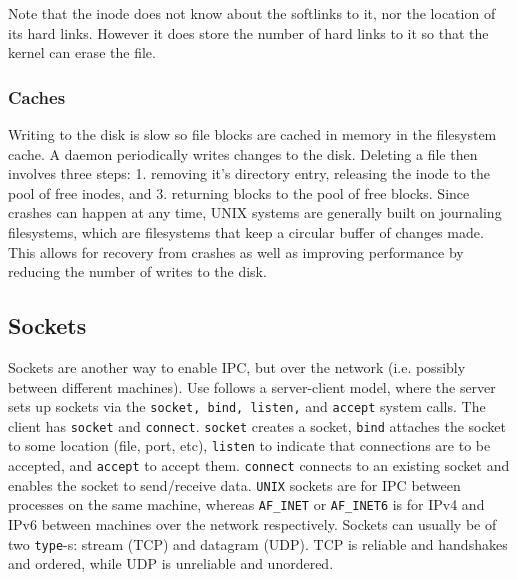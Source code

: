\documentclass[../notes.tex]{subfiles}
\begin{document}
Note that the inode does not know about the softlinks to it, nor the location of its hard links. However it does store the number of hard links to it so that the kernel can erase the file.

\subsubsection{Caches}

Writing to the disk is slow so file blocks are cached in memory in the filesystem cache. A daemon periodically writes changes to the disk.
Deleting a file then involves three steps: 1. removing it's directory entry, releasing the inode to the pool of free inodes, and 3. returning blocks to the pool of free blocks.
Since crashes can happen at any time, UNIX systems are generally built on journaling filesystems, which are filesystems that keep a circular buffer of changes made. This allows for recovery from crashes as well as improving performance by reducing the number of writes to the disk. 






\subsection{Sockets}

Sockets are another way to enable IPC, but over the network (i.e. possibly between different machines).
Use follows a server-client model, where the server sets up sockets via the \texttt{socket, bind, listen,} and \texttt{accept} system calls. The client has \texttt{socket} and \texttt{connect}.
\texttt{socket} creates a socket, \texttt{bind} attaches the socket to some location (file, port, etc), \texttt{listen} to indicate that connections are to be accepted, and \texttt{accept} to accept them. \texttt{connect} connects to an existing socket and enables the socket to send/receive data.
\texttt{UNIX} sockets are for IPC between processes on the same machine, whereas \texttt{AF\_INET} or \texttt{AF\_INET6} is for IPv4 and IPv6 between machines over the network respectively.
Sockets can usually be of two \texttt{type}-s: stream (TCP) and datagram (UDP). TCP is reliable and handshakes and ordered, while UDP is unreliable and unordered.
\end{document}
